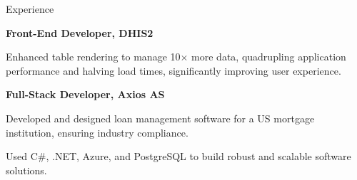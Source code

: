 \begin{rubric}{Experience}
\begin{compactitem}
    \vspace{-12pt}
\end{compactitem}
%
\entry*[2017 -- 2018]%
\textbf{Front-End Developer, DHIS2} \par
\begin{compactitem}
    \item Enhanced table rendering to manage 10$\times$ more data, quadrupling application performance and halving load times, significantly improving user experience.
    \vspace{-12pt}
\end{compactitem}
%
\entry*[2014 -- 2016]%
\textbf{Full-Stack Developer, Axios AS} \par
\begin{compactitem}
    \item Developed and designed loan management software for a US mortgage institution, ensuring industry compliance.
    \item Used C\#, .NET, Azure, and PostgreSQL to build robust and scalable software solutions.
    \vspace{-12pt}
\end{compactitem}
%
\end{rubric}